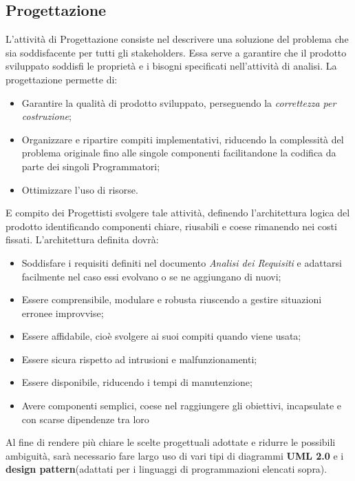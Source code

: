 \documentclass[NormeDiProgetto.tex]{subfiles}
\begin{document}





\subsection{Progettazione}
L’attività di Progettazione consiste nel descrivere una soluzione del problema
che sia soddisfacente per tutti gli stakeholders. Essa serve a garantire che
il prodotto sviluppato soddisfi le proprietà e i bisogni specificati nell’attività
di analisi. La progettazione permette di:
\begin{itemize}
	\item Garantire la qualità di prodotto sviluppato, perseguendo la \textit{correttezza
		per costruzione};
	\item Organizzare e ripartire compiti implementativi, riducendo la
	complessità del problema originale fino alle singole componenti
	facilitandone la codifica da parte dei singoli Programmatori;
	\item Ottimizzare l’uso di risorse.
\end{itemize}
E compito dei Progettisti svolgere tale attività, definendo l’architettura logica
del prodotto identificando componenti chiare, riusabili e coese rimanendo nei
costi fissati. L’architettura definita dovrà:
\begin{itemize}
	\item Soddisfare i requisiti definiti nel documento \textit{Analisi dei Requisiti} e
	adattarsi facilmente nel caso essi evolvano o se ne aggiungano di nuovi; 
	\item Essere comprensibile, modulare e robusta riuscendo a gestire situazioni
	erronee improvvise;

	\item Essere affidabile, cioè svolgere ai suoi compiti quando viene usata;
	\item Essere sicura rispetto ad intrusioni e malfunzionamenti;
	\item Essere disponibile, riducendo i tempi di manutenzione;
	\item Avere componenti semplici, coese nel raggiungere gli obiettivi,
	incapsulate e con scarse dipendenze tra loro
\end{itemize}
Al fine di rendere più chiare le scelte progettuali adottate e
ridurre le possibili ambiguità, sarà necessario fare largo uso di vari tipi di diagrammi 
\textbf{UML 2.0} e i \textbf{design pattern}(adattati per i linguaggi di programmazioni elencati sopra).
\end{document}
